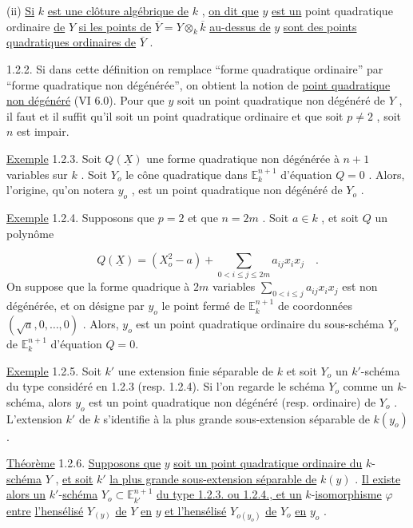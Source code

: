 (ii) \underline{Si} $k$ \underline{est une clôture algébrique de} $k$ , \underline{on dit que} $y$ \underline{est un} point quadratique ordinaire \underline{de} $Y$ \underline{si les points de} $\overline{Y} = Y \otimes_k \overline{k}$ \underline{au-dessus de} $y$ \underline{sont des points quadratiques ordinaires de} $\overline{Y}$ .

1.2.2. Si dans cette définition on remplace ``forme quadratique ordinaire'' par ``forme quadratique non dégénérée'', on obtient la notion de \underline{point quadratique non dégénéré} (VI 6.0). Pour que $y$ soit un point quadratique non dégénéré de $Y$ , il faut et il suffit qu'il soit un point quadratique ordinaire et que soit $p \neq 2$ ,
soit $n$ est impair.

\underline{Exemple} 1.2.3. Soit $Q(\underline{X})$ une forme quadratique non dégénérée à $n+1$ variables sur $k$ . Soit $Y_o$ le cône quadratique dans $\mathbb{E}^{n+1}_k$ d'équation $Q = 0$ . Alors, l'origine, qu'on notera $y_o$ , est un point quadratique non dégénéré de $Y_o$ .

\underline{Exemple} 1.2.4. Supposons que $p = 2$ et que $n = 2m$ . Soit $a \in k$ , et soit $Q$ un polynôme

\begin{equation*}
Q(\underline{X}) = (X_o^2 - a) + \sum_{0<i\leq j\leq 2m} a_{ij}x_ix_j \quad .
\end{equation*}
On suppose que la forme quadrique à $2m$ variables $\sum_{0<i\leq j} a_{ij}x_ix_j$ est non dégénérée, et on désigne par $y_o$ le point fermé de $\mathbb{E}^{n+1}_k$ de coordonnées $(\sqrt{a},0,\ldots,0)$ . Alors, $y_o$ est un point quadratique ordinaire du sous-schéma $Y_o$ de $\mathbb{E}^{n+1}_k$ d'équation $Q = 0$.

\underline{Exemple} 1.2.5. Soit $k'$ une extension finie séparable de $k$ et soit $Y_o$ un $k'$-schéma du type considéré en 1.2.3 (resp. 1.2.4). Si l'on regarde le schéma $Y_o$ comme un $k$-schéma, alors $y_o$ est un point quadratique non dégénéré (resp. ordinaire) de $Y_o$ . L'extension $k'$ de $k$ s'identifie à la plus grande sous-extension séparable de $k(y_o)$ .

\underline{Théorème} 1.2.6. \underline{Supposons que} $y$ \underline{soit un point quadratique ordinaire du} $k$-\underline{schéma} $Y$ , \underline{et soit} $k'$ \underline{la plus grande sous-extension séparable de} $k(y)$ . \underline{Il existe alors un} $k'$-\underline{schéma} $Y_o \subset \mathbb{E}^{n+1}_{k'}$ \underline{du type 1.2.3. ou 1.2.4., et un} $k$-\underline{isomorphisme} $\varphi$ \underline{entre} \underline{l'hensélisé} $Y_{(y)}$ \underline{de} $Y$ \underline{en} $y$ \underline{et l'hensélisé} $Y_{o(y_o)}$ \underline{de} $Y_o$ \underline{en} $y_o$ .

